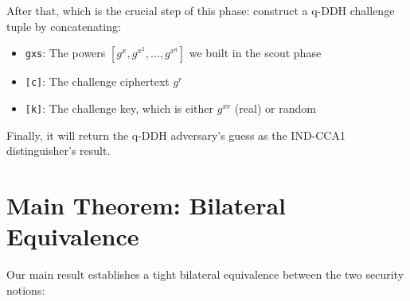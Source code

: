 After that, which is the crucial step of this phase: construct a q-DDH challenge tuple by concatenating:
  \begin{itemize}
  \item \texttt{gxs}: The powers $[g^x, g^{x^2}, \ldots, g^{x^q}]$ we built in the scout phase
  \item \texttt{[c]}: The challenge ciphertext $g^r$
  \item \texttt{[k]}: The challenge key, which is either $g^{xr}$ (real) or random
  \end{itemize}
Finally, it will return the q-DDH adversary's guess as the IND-CCA1 distinguisher's result.
















































\section{Main Theorem: Bilateral Equivalence}
\label{sec:main-theorem4}

Our main result establishes a tight bilateral equivalence between the two security notions:

